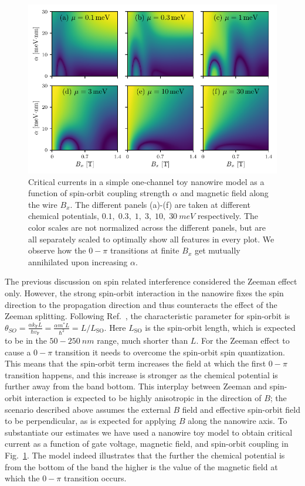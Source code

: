 \begin{figure}
\begin{center}
\includegraphics[width=0.75\columnwidth]{chapter_supercurrent/figures/sup_fig7}
\caption{Critical currents in a simple one-channel toy nanowire model\cite{Lutchyn2010,Oreg2010} as a function of spin-orbit coupling strength $\alpha$ and magnetic field along the wire $B_x$.
The different panels (a)-(f) are taken at different chemical potentials, $0.1,\; 0.3,\; 1,\; 3,\; 10,\; \SI{30}{meV}$ respectively.
The color scales are not normalized across the different panels, but are all separately scaled to optimally show all features in every plot.
We observe how the $0-\pi$ transitions at finite $B_x$ get mutually annihilated upon increasing $\alpha$.\label{fig:currents_1D_alpha_vs_B_x}}
\end{center}
\end{figure}

The previous discussion on spin related interference considered the Zeeman effect only.
However, the strong spin-orbit interaction in the nanowire fixes the spin direction to the propagation direction and thus counteracts the effect of the Zeeman splitting.
Following Ref.~\cite{Yokoyama2014}, the characteristic parameter for spin-orbit is $\theta_{SO} = \frac{\alpha k_\mathrm{F} L}{\hbar v_\mathrm{F}} = \frac{\alpha m^* L}{\hbar^2} = L/L_\mathrm{SO}$.
Here $L_\mathrm{SO}$ is the spin-orbit length, which is expected to be in the $50-\SI{250}{nm}$ range, much shorter than $L$.
For the Zeeman effect to cause a $0-\pi$ transition it needs to overcome the spin-orbit spin quantization.
This means that the spin-orbit term increases the field at which the first $0-\pi$ transition happens, and this increase is stronger as the chemical potential is further away from the band bottom.
This interplay between Zeeman and spin-orbit interaction is expected to be highly anisotropic\cite{Yokoyama2014} in the direction of $B$; the scenario described above assumes the external $B$ field and effective spin-orbit field to be perpendicular, as is expected for applying $B$ along the nanowire axis.
To substantiate our estimates we have used a nanowire toy model\cite{Lutchyn2010,Oreg2010} to obtain critical current as a function of gate voltage, magnetic field, and spin-orbit coupling in Fig.~\ref{fig:currents_1D_alpha_vs_B_x}.
The model indeed illustrates that the further the chemical potential is from the bottom of the band the higher is the value of the magnetic field at which the $0-\pi$ transition occurs.

